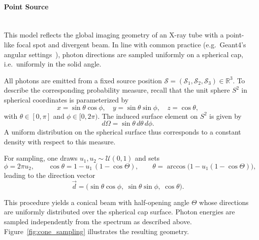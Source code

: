 \paragraph{Point Source} \ \\
This model reflects the global imaging geometry of an X-ray tube with a
point-like focal spot and divergent beam. In line with common practice (e.g.\
Geant4's angular settings~\cite{geant4}), photon directions are sampled
uniformly on a spherical cap, i.e.\ uniformly in the solid angle.

All photons are emitted from a fixed source position
$\mathcal{S}=(\mathcal{S}_1,\mathcal{S}_2,\mathcal{S}_3)\in\mathbb{R}^3$. To
describe the corresponding probability measure, recall that the unit sphere
$S^2$ in spherical coordinates is parameterized by
\[
x=\sin\theta\cos\phi,\quad y=\sin\theta\sin\phi,\quad z=\cos\theta,
\]
with $\theta\in[0,\pi]$ and $\phi\in[0,2\pi)$. The induced surface element on
$S^2$ is given by
\[
d\Omega = \sin\theta\,d\theta\,d\phi .
\]
A uniform distribution
on the spherical surface thus corresponds to a constant density with respect to
this measure. 



For sampling, one draws $u_1,u_2\sim\mathcal{U}(0,1)$ and sets
\begin{equation*}
    \phi = 2\pi u_2,\qquad
    \cos\theta = 1 - u_1\,(1-\cos\Theta),\qquad
    \theta = \arccos \bigl(1-u_1(1-\cos\Theta)\bigr),
\end{equation*}
leading to the direction vector
\begin{equation*}
    \vec{d}=\bigl(\sin\theta\cos\phi,\; \sin\theta\sin\phi,\; \cos\theta\bigr).
\end{equation*}

This procedure yields a conical beam with half-opening angle $\Theta$ whose
directions are uniformly distributed over the spherical cap surface. Photon
energies are sampled independently from the spectrum as described above.
Figure~\ref{fig:cone_sampling} illustrates the resulting geometry.

